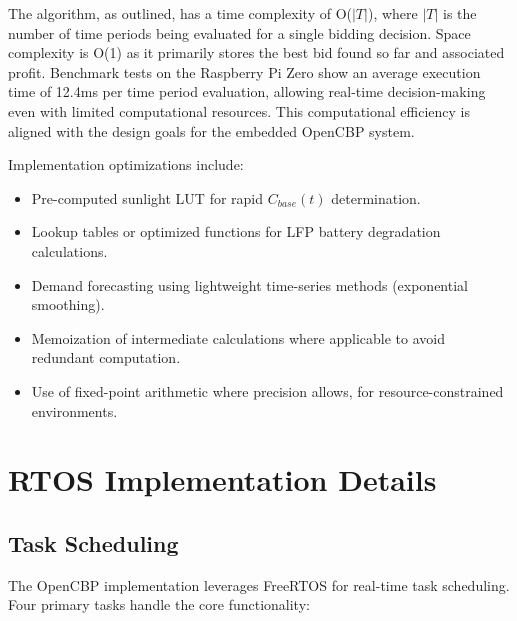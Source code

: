 \documentclass[11pt,a4paper]{article}
\begin{document}
The algorithm, as outlined, has a time complexity of O($|T|$), where $|T|$ is the number of time periods being evaluated for a single bidding decision. Space complexity is O(1) as it primarily stores the best bid found so far and associated profit. Benchmark tests on the Raspberry Pi Zero show an average execution time of 12.4ms per time period evaluation, allowing real-time decision-making even with limited computational resources. This computational efficiency is aligned with the design goals for the embedded OpenCBP system.

Implementation optimizations include:
\begin{itemize}
    \item Pre-computed sunlight LUT for rapid $C_{base}(t)$ determination.
    \item Lookup tables or optimized functions for LFP battery degradation calculations.
    \item Demand forecasting using lightweight time-series methods (exponential smoothing).
    \item Memoization of intermediate calculations where applicable to avoid redundant computation.
    \item Use of fixed-point arithmetic where precision allows, for resource-constrained environments.
\end{itemize}

\section{RTOS Implementation Details}
\subsection{Task Scheduling}

The OpenCBP implementation leverages FreeRTOS for real-time task scheduling. Four primary tasks handle the core functionality:
\end{document}
